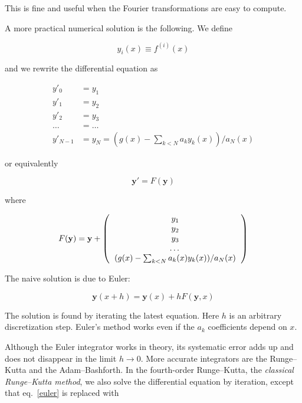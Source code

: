 \documentclass[justified,sixbynine]{tufte-book}
\theoremstyle{plain}%
\theoremstyle{definition}
\theoremstyle{remark}
\begin{document}
\begin{fullwidth}
This is fine and useful when the Fourier transformations are easy to compute.

A more practical numerical solution is the following. We define

\begin{equation}
y_i(x) \equiv f^{(i)}(x)
\end{equation}

and we rewrite the differential equation as

\begin{align}
y'_0 &= y_1 \\
y'_1 &= y_2 \\
y'_2 &= y_3 \\
\dots &= \dots \\
y'_{N-1} &= y_N = (g(x)-\sum_{k<N} a_k y_k(x))/a_N(x)
\end{align}

or equivalently

\begin{equation}
\mathbf{y}' = F(\mathbf{y})
\end{equation}

where

\begin{equation}
F(\mathbf{y}) = \mathbf{y}+\left(\begin{tabular}{c}
$y_1$ \\
$y_2$ \\
$y_3$ \\
\dots \\
$(g(x)-\sum_{k<N} a_k(x)y_k(x))/a_N(x)$
\end{tabular}\right)
\end{equation}

The naive solution is due to Euler:

\begin{equation}
\mathbf{y}(x+h) = \mathbf{y}(x) + hF(\mathbf{y},x)\label{euler}
\end{equation}

The solution is found by iterating the latest equation. Here $h$ is an arbitrary discretization step. Euler's method works even if the $a_k$ coefficients depend on $x$.

 Although the Euler integrator works in theory, its systematic error adds up and does not disappear in the limit $h\rightarrow 0$. More accurate integrators are the Runge--Kutta and the Adam--Bashforth. In the fourth-order Runge--Kutta, the {\it classical Runge--Kutta method}, we also solve the differential equation by iteration, except that eq.~\ref{euler} is replaced with


\end{fullwidth}
\end{document}
